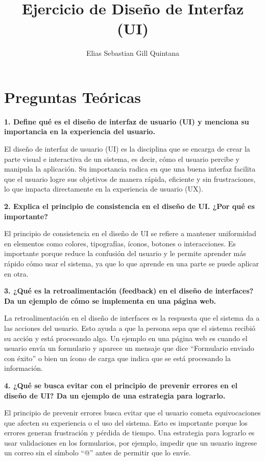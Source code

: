 \documentclass[12pt, a4paper]{article}
\title{\textbf{Ejercicio de Diseño de Interfaz (UI)}}
\author{Elias Sebastian Gill Quintana}
\date{}
\begin{document}
\maketitle

\section*{Preguntas Teóricas}

\textbf{1. Define qué es el diseño de interfaz de usuario (UI) y menciona su importancia en la experiencia del usuario.}  

El diseño de interfaz de usuario (UI) es la disciplina que se encarga de crear la parte visual
e interactiva de un sistema, es decir, cómo el usuario percibe y manipula la aplicación. Su
importancia radica en que una buena interfaz facilita que el usuario logre sus objetivos de
manera rápida, eficiente y sin frustraciones, lo que impacta directamente en la experiencia de
usuario (UX).  

\textbf{2. Explica el principio de consistencia en el diseño de UI. ¿Por qué es importante?}  

El principio de consistencia en el diseño de UI se refiere a mantener uniformidad en elementos
como colores, tipografías, íconos, botones o interacciones. Es importante porque reduce la
confusión del usuario y le permite aprender más rápido cómo usar el sistema, ya que lo que
aprende en una parte se puede aplicar en otra.  

\textbf{3. ¿Qué es la retroalimentación (feedback) en el diseño de interfaces? Da un ejemplo de cómo se implementa en una página web.}  

La retroalimentación en el diseño de interfaces es la respuesta que el sistema da a las
acciones del usuario. Esto ayuda a que la persona sepa que el sistema recibió su acción y está
procesando algo. Un ejemplo en una página web es cuando el usuario envía un formulario y
aparece un mensaje que dice “Formulario enviado con éxito” o bien un ícono de carga que indica
que se está procesando la información.  

\textbf{4. ¿Qué se busca evitar con el principio de prevenir errores en el diseño de UI? Da un ejemplo de una estrategia para lograrlo.}  

El principio de prevenir errores busca evitar que el usuario cometa equivocaciones que afecten
su experiencia o el uso del sistema. Esto es importante porque los errores generan frustración
y pérdida de tiempo. Una estrategia para lograrlo es usar validaciones en los formularios, por
ejemplo, impedir que un usuario ingrese un correo sin el símbolo “@” antes de permitir que lo
envíe.  
\end{document}
